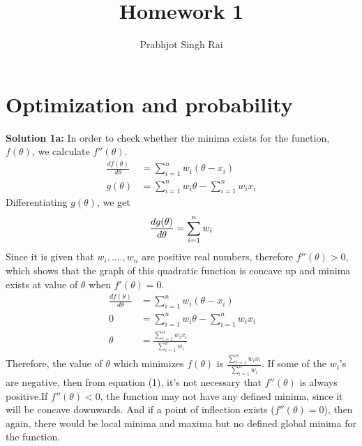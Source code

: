 \documentclass[11pt]{article}
\begin{document}
\title{Homework 1}
\author{Prabhjot Singh Rai}
\maketitle

\section{Optimization and probability}

\textbf{Solution 1a:} In order to check whether the minima exists for the function, $f(\theta)$, we calculate $f''(\theta)$.
\begin{equation*}
\begin{split}
\frac{df(\theta)}{d\theta} & = \sum_{i=1}^{n} w_i(\theta - x_i)\\
g(\theta)& = \sum_{i=1}^{n} w_i \theta - \sum_{i=1}^{n} w_i x_i
\end{split}
\end{equation*}
Differentiating $g(\theta)$, we get
\begin{equation}
\frac{dg(\theta)}{d\theta} = \sum_{i=1}^{n} w_i \\
\end{equation}
Since it is given that $w_i, ...., w_n$ are positive real numbers, therefore $f''(\theta) > 0$, which shows that the graph of this quadratic function is concave up and minima exists at value of $\theta$ when $f'(\theta) = 0$.
\begin{equation*}\
\begin{split}
\frac{df(\theta)}{d\theta} & =  \sum_{i=1}^{n} w_i(\theta - x_i)\\
0 & = \sum_{i=1}^{n} w_i \theta - \sum_{i=1}^{n} w_i x_i\\
\theta & = \frac{\sum_{i=1}^{n} w_i x_i}{\sum_{i=1}^{n} w_i}
\end{split}
\end{equation*}
Therefore, the value of $\theta$ which minimizes $f(\theta)$ is $ \frac{\sum_{i=1}^{n} w_i x_i}{\sum_{i=1}^{n} w_i}$.
If some of the $w_i$'s are negative, then from equation (1), it's not necessary that $f''(\theta)$ is always positive.If $f''(\theta)<0$, the function may not have any defined minima, since it will be concave downwards. And if a point of inflection exists ($f''(\theta) = 0$), then again, there would be local minima and maxima but no defined global minima for the function.
\end{document}
